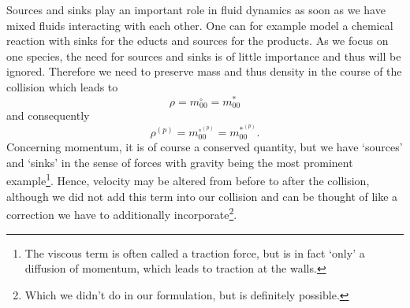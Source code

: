 Sources and sinks play an important role in fluid dynamics as soon as we have mixed fluids interacting with each other.
One can for example model a chemical reaction with sinks for the educts and sources for the products.
As we focus on one species, the need for sources and sinks is of little importance and thus will be ignored.
Therefore we need to preserve mass and thus density in the course of the collision which leads to
\begin{equation}
    \rho  = m_{00}^\circ = m_{00}^*
\end{equation}
and consequently
\begin{equation}
  \label{eq: absence of sources}
    \rho^{(p)} = m_{00}^{\circ^{(p)}} = m_{00}^{*^{(p)}}.
\end{equation}
Concerning momentum, it is of course a conserved quantity, but we have `sources' and `sinks' in the sense of forces with gravity being the most prominent example\footnote{The viscous term is often called a traction force, but is in fact `only' a diffusion of momentum, which leads to traction at the walls.}.
Hence, velocity may be altered from before to after the collision, although we did not add this term into our collision and can be thought of like a correction we have to additionally incorporate\footnote{Which we didn't do in our formulation, but is definitely possible.}.
